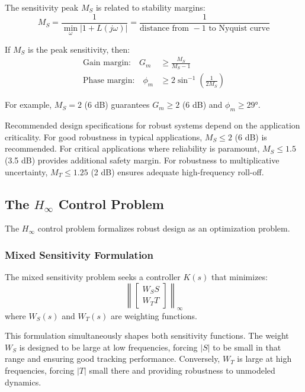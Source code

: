 The sensitivity peak $M_S$ is related to stability margins:
\begin{equation}
M_S = \frac{1}{\min_\omega |1 + L(j\omega)|} = \frac{1}{\text{distance from } -1 \text{ to Nyquist curve}}
\label{eq:MS_margin}
\end{equation}

\begin{theorem}
\label{thm:margins_MS}
If $M_S$ is the peak sensitivity, then:
\begin{align}
\text{Gain margin:} \quad G_m &\geq \frac{M_S}{M_S - 1} \\
\text{Phase margin:} \quad \phi_m &\geq 2 \sin^{-1}\left(\frac{1}{2M_S}\right)
\end{align}
\end{theorem}

For example, $M_S = 2$ (6 dB) guarantees $G_m \geq 2$ (6 dB) and $\phi_m \geq 29°$.

Recommended design specifications for robust systems depend on the application criticality. For good robustness in typical applications, $M_S \leq 2$ (6 dB) is recommended. For critical applications where reliability is paramount, $M_S \leq 1.5$ (3.5 dB) provides additional safety margin. For robustness to multiplicative uncertainty, $M_T \leq 1.25$ (2 dB) ensures adequate high-frequency roll-off.

\subsection{The $H_\infty$ Control Problem}
\label{subsec:hinf_problem}

The $H_\infty$ control problem formalizes robust design as an optimization problem.

\subsubsection{Mixed Sensitivity Formulation}

The mixed sensitivity problem seeks a controller $K(s)$ that minimizes:
\begin{equation}
\left\| \begin{bmatrix} W_S S \\ W_T T \end{bmatrix} \right\|_\infty
\label{eq:mixed_sensitivity}
\end{equation}
where $W_S(s)$ and $W_T(s)$ are weighting functions.

This formulation simultaneously shapes both sensitivity functions. The weight $W_S$ is designed to be large at low frequencies, forcing $|S|$ to be small in that range and ensuring good tracking performance. Conversely, $W_T$ is large at high frequencies, forcing $|T|$ small there and providing robustness to unmodeled dynamics.


